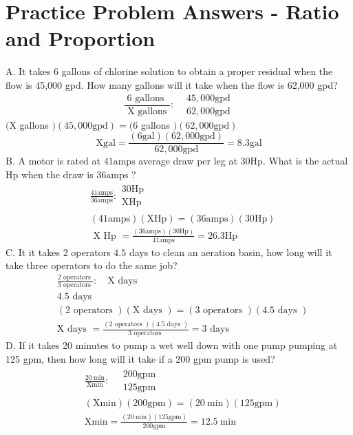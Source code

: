 \documentclass[10pt]{article}
\begin{document}
\section{Practice Problem Answers - Ratio and Proportion}
A. It takes 6 gallons of chlorine solution to obtain a proper residual when the flow is 45,000 gpd. How many gallons will it take when the flow is 62,000 gpd?
$$
\frac{6 \text { gallons }}{\text { X gallons }}: \begin{aligned}
&45,000 \mathrm{gpd} \\
&62,000 \mathrm{gpd}
\end{aligned}
$$
$(\mathrm{X}$ gallons $)(45,000 \mathrm{gpd})=(6$ gallons $)(62,000 \mathrm{gpd})$
$$
\mathrm{X} \mathrm{gal}=\frac{(6 \mathrm{gal})(62,000 \mathrm{gpd})}{62,000 \mathrm{gpd}}=8.3 \mathrm{gal}
$$
B. A motor is rated at $41 \mathrm{amps}$ average draw per leg at $30 \mathrm{Hp}$. What is the actual $\mathrm{Hp}$ when the draw is $36 \mathrm{amps}$ ?
$$
\begin{aligned}
&\frac{41 \mathrm{amps}}{36 \mathrm{amps}}: \begin{array}{l}
30 \mathrm{Hp} \\
\mathrm{XHp}
\end{array} \\
&(41 \mathrm{amps})(\mathrm{X} \mathrm{Hp})=(36 \mathrm{amps})(30 \mathrm{Hp}) \\
&\text { X Hp }=\frac{(36 \mathrm{amps})(30 \mathrm{Hp})}{41 \mathrm{amps}}=26.3 \mathrm{Hp}
\end{aligned}
$$
C. It it takes 2 operators $4.5$ days to clean an aeration basin, how long will it take three operators to do the same job?
$$
\begin{aligned}
&\frac{2 \text { operators }}{3 \text { operators }}: \quad \mathrm{X} \text { days } \\
&4.5 \text { days } \\
&(2 \text { operators })(\mathrm{X} \text { days })=(3 \text { operators })(4.5 \text { days }) \\
&\mathrm{X} \text { days }=\frac{(2 \text { operators })(4.5 \text { days })}{3 \text { operators }}=3 \text { days }
\end{aligned}
$$
D. If it takes 20 minutes to pump a wet well down with one pump pumping at 125 gpm, then how long will it take if a 200 gpm pump is used?
$$
\begin{aligned}
&\frac{20 \mathrm{~min}}{\mathrm{Xmin}}: \quad \begin{array}{l}
200 \mathrm{gpm} \\
125 \mathrm{gpm}
\end{array} \\
&(\mathrm{Xmin})(200 \mathrm{gpm})=(20 \mathrm{~min})(125 \mathrm{gpm}) \\
&\mathrm{Xmin}=\frac{(20 \mathrm{~min})(125 \mathrm{gpm})}{200 \mathrm{gpm}}=12.5 \mathrm{~min}
\end{aligned}
$$
\end{document}
